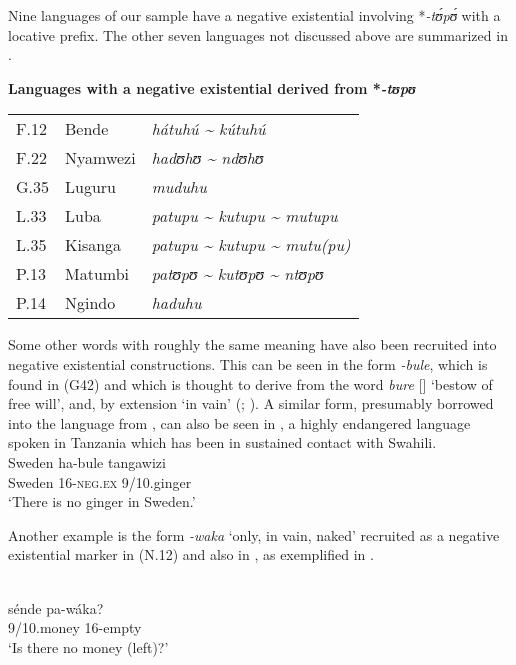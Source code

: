 \documentclass[output=paper,draft,draftmode,colorlinks,citecolor=brown]{langscibook}
\begin{document}
Nine languages of our sample have a negative existential involving
*\textit{-t{\'ʊ}p{\'ʊ}} with a locative prefix. The other seven languages not discussed above are summarized in
.  
%
\begin{exe}\ex\textbf{Languages with a
negative existential derived from *\textit{-tʊpʊ}}\\
\begin{tabular}{@{}lll@{}}
F.12 	&Bende &\textit{hátuhú {\textasciitilde} kútuhú}\\
F.22 &Nyamwezi &\textit{hadʊhʊ {\textasciitilde} ndʊhʊ} \\ 
G.35 	&Luguru
&\textit{muduhu}\\ L.33 	&Luba 		&\textit{patupu {\textasciitilde}
kutupu {\textasciitilde} mutupu} \\ L.35 	&Kisanga 		&\textit{patupu
{\textasciitilde} kutupu {\textasciitilde} mutu(pu)}\\ P.13 	&Matumbi
&\textit{patʊpʊ {\textasciitilde} kutʊpʊ {\textasciitilde} ntʊpʊ}\\ P.14
&Ngindo 		&\textit{haduhu}\\
\end{tabular}\label{ex:neg-derived-empty} \end{exe}
%
Some other words with
roughly the same meaning have also been recruited into negative existential
constructions. This can be seen in the form \textit{-bule}, which is found
in  (G42) and which is thought to derive from the 
word \textit{bure} [] `bestow of free will', and, by extension
`in vain' (\citealt[42]{Johnson1939}; \citealt[48]{TUKI2014}). A similar form,
presumably borrowed into the language from , can also be seen in
, a highly endangered language spoken in Tanzania which has been
in sustained contact with Swahili.  \ea\label{ex:kami-sweden}
\\
\gll Sweden ha-bule tangawizi\\
Sweden 16-\textsc{neg.ex} 9/10.ginger\\
\glt `There is no
ginger in Sweden.'
\z

Another example is the form \textit{-waka} `only,
in vain, naked' recruited as a negative existential marker in 
(N.12) and also in , as exemplified in .

\ea\label{ex:manda-money} \\
\gll s{é}nde pa-wáka? \\ 9/10.money
16-empty\\
\glt `Is there no money (left)?'
\z
\end{document}
